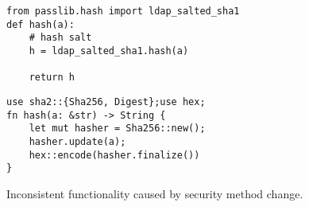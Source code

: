 \begin{figure*}[htb]
\centering
\begin{minipage}{.49\textwidth}
\begin{tcolorbox}[colback=gray!5!white, colframe=cyan!40!black, boxsep=2pt, top=1mm, bottom=1mm, left=0pt, right=0pt, title=\centering{Original code}]
\begin{verbatim}
from passlib.hash import ldap_salted_sha1
def hash(a):
    # hash salt
    h = ldap_salted_sha1.hash(a)
    
    return h
\end{verbatim}
\end{tcolorbox}
\end{minipage}
\hfill
\begin{minipage}{.49\textwidth}
\centering
\begin{tcolorbox}[colback=gray!5!white, colframe=cyan!40!black, boxsep=2pt, top=1mm, bottom=1mm, left=0pt, right=0pt, title=\centering{Transformed code}]
\begin{verbatim}
use sha2::{Sha256, Digest};use hex;
fn hash(a: &str) -> String {
    let mut hasher = Sha256::new();
    hasher.update(a);
    hex::encode(hasher.finalize())
}
\end{verbatim}
\end{tcolorbox}
\end{minipage}
\caption{Inconsistent functionality caused by security method change.}
\label{code:eva:hashing}
\end{figure*}

